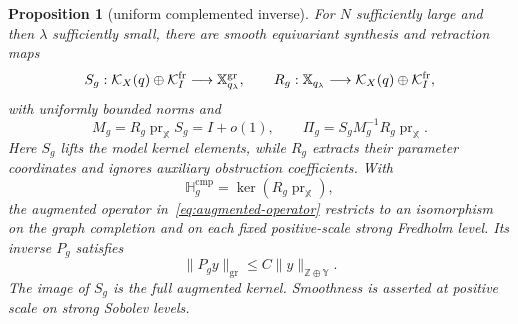 \documentclass[11pt]{amsart}
\newtheorem{proposition}[theorem]{Proposition}
\theoremstyle{definition}
\theoremstyle{remark}
\theoremstyle{plain}
\newcommand{\cK}{\mathcal{K}}
\begin{document}
\begin{proposition}[uniform complemented inverse]\label{prop:uniform-inverse}
For $N$ sufficiently large and then $\lambda$ sufficiently small,
there are smooth equivariant synthesis and retraction maps
\begin{equation}\label{eq:synthesis}
 S_g:\cK_X(q)\oplus\cK_I^{\rm fr}\longrightarrow
 \mathbb X^{\mathrm{gr}}_{q_\lambda},
 \qquad
 R_g:\mathbb X_{q_\lambda}\longrightarrow
 \cK_X(q)\oplus\cK_I^{\rm fr},
\end{equation}
with uniformly bounded norms and
\begin{equation}\label{eq:model-matrix}
 M_g=R_g\operatorname{pr}_{\mathbb X}S_g=I+o(1),
 \qquad
 \Pi_g=S_gM_g^{-1}R_g\operatorname{pr}_{\mathbb X}.
\end{equation}
Here $S_g$ lifts the model kernel elements, while $R_g$ extracts their
parameter coordinates and ignores auxiliary obstruction coefficients.  With
\begin{equation}\label{eq:complement-space}
 \mathbb H_g^{\mathrm{cmp}}
 =\ker(R_g\operatorname{pr}_{\mathbb X}),
\end{equation}
the augmented operator in~\eqref{eq:augmented-operator} restricts to an
isomorphism on the graph completion and on each fixed positive-scale
strong Fredholm level.  Its inverse $P_g$ satisfies
\begin{equation}\label{eq:uniform-inverse-bound}
 \|P_gy\|_{\mathrm{gr}}\leq C\|y\|_{\mathbb Z\oplus\mathbb Y}.
\end{equation}
The image of $S_g$ is the full augmented kernel.  Smoothness is
asserted at positive scale on strong Sobolev levels.
\end{proposition}
\end{document}
